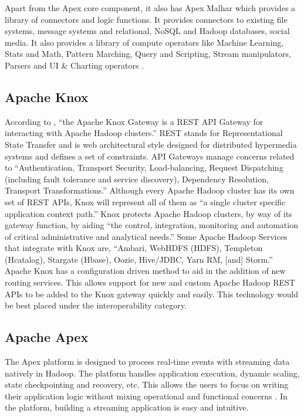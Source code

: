      Apart from the Apex core component, it also has Apex Malhar which
     provides a library of connectors and logic functions. It provides
     connectors to existing file systems, message systems and relational,
     NoSQL and Hadoop databases, social media. It also provides a library
     of compute operators like Machine Learning, Stats and Math, Pattern
     Marching, Query and Scripting, Stream manipulators, Parsers and UI \&
     Charting operators \cite{www-apacheapexblog}.

\subsection{Apache Knox}

     According to \cite{knox}, ``the Apache Knox Gateway is a REST API
     Gateway for interacting with Apache Hadoop clusters.'' REST stands
     for Representational State Transfer and is web architectural
     style designed for distributed hypermedia systems and defines a
     set of constraints. \cite{fielding} API Gateways manage concerns
     related to ``Authentication, Transport Security, Load-balancing,
     Request Dispatching (including fault tolerance and service
     discovery), Dependency Resolution, Transport Transformations.''
     \cite{peyrott} Although every Apache Hadoop cluster has its own
     set of REST APIs, Knox will represent all of them as ``a single
     cluster specific application context path.'' \cite{knox} Knox
     protects Apache Hadoop clusters, by way of its gateway function,
     by aiding ``the control, integration, monitoring and automation of
     critical administrative and analytical needs.'' \cite{knox} Some
     Apache Hadoop Services that integrate with Knox are, ``Ambari,
     WebHDFS (HDFS), Templeton (Hcatalog), Stargate (Hbase), Oozie,
     Hive/JDBC, Yarn RM, [and] Storm.''  \cite{knox} Apache Knox has a
     configuration driven method to aid in the addition of new routing
     services. \cite{knox} This allows support for new and custom
     Apache Hadoop REST APIs to be added to the Knox gateway quickly
     and easily. \cite{knox} This technology would be best placed
     under the interoperability category.

\subsection{    Apache Apex}

     The Apex platform is designed to process real-time events with
     streaming data natively in Hadoop. The platform handles
     application execution, dynamic scaling, state checkpointing and
     recovery, etc. This allows the users to focus on writing their
     application logic without mixing operational and functional
     concerns \cite{apache-apex}. In the platform, building a
     streaming application is easy and intuitive.

